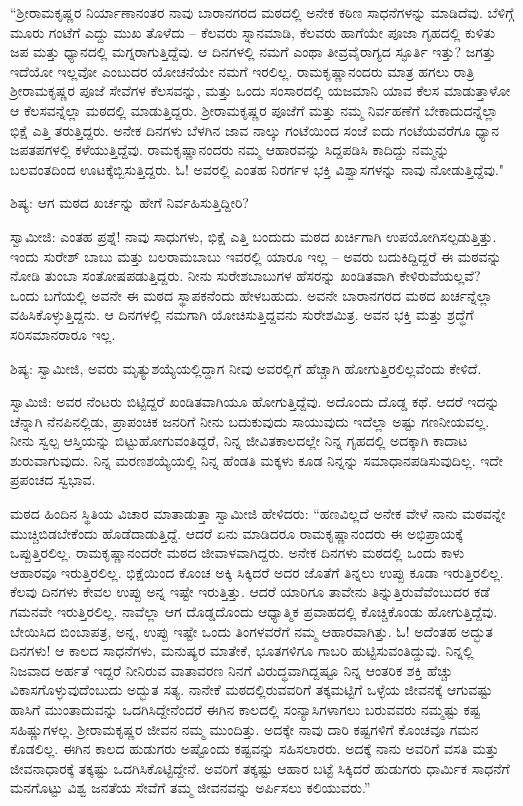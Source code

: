 “ಶ‍್ರೀರಾಮಕೃಷ್ಣರ ನಿರ್ಯಾಣಾನಂತರ ನಾವು ಬಾರಾನಗರದ ಮಠದಲ್ಲಿ ಅನೇಕ ಕಠಿಣ ಸಾಧನೆಗಳನ್ನು ಮಾಡಿದೆವು. ಬೆಳಿಗ್ಗೆ ಮೂರು ಗಂಟೆಗೆ ಎದ್ದು ಮುಖ ತೊಳೆದು – ಕೆಲವರು ಸ್ನಾನಮಾಡಿ, ಕೆಲವರು ಹಾಗೆಯೇ ಪೂಜಾ ಗೃಹದಲ್ಲಿ ಕುಳಿತು ಜಪ ಮತ್ತು ಧ್ಯಾನದಲ್ಲಿ ಮಗ್ನರಾಗುತ್ತಿದ್ದೆವು. ಆ ದಿನಗಳಲ್ಲಿ ನಮಗೆ ಎಂಥಾ ತೀವ್ರವೈರಾಗ್ಯದ ಸ್ಫೂರ್ತಿ ಇತ್ತು? ಜಗತ್ತು ಇದೆಯೋ ಇಲ್ಲವೋ ಎಂಬುದರ ಯೋಚನೆಯೇ ನಮಗೆ ಇರಲಿಲ್ಲ. ರಾಮಕೃಷ್ಣಾನಂದರು ಮಾತ್ರ ಹಗಲು ರಾತ್ರಿ ಶ‍್ರೀರಾಮಕೃಷ್ಣರ ಪೂಜೆ ಸೇವೆಗಳ ಕೆಲಸವನ್ನು, ಮತ್ತು ಒಂದು ಸಂಸಾರದಲ್ಲಿ ಯಜಮಾನಿ ಯಾವ ಕೆಲಸ ಮಾಡುತ್ತಾಳೋ ಆ ಕೆಲಸವನ್ನೆಲ್ಲಾ ಮಠದಲ್ಲಿ ಮಾಡುತ್ತಿದ್ದರು. ಶ‍್ರೀರಾಮಕೃಷ್ಣರ ಪೂಜೆಗೆ ಮತ್ತು ನಮ್ಮ ನಿರ್ವಹಣೆಗೆ ಬೇಕಾದುದನ್ನೆಲ್ಲಾ ಭಿಕ್ಷೆ ಎತ್ತಿ ತರುತ್ತಿದ್ದರು. ಅನೇಕ ದಿನಗಳು ಬೆಳಗಿನ ಜಾವ ನಾಲ್ಕು ಗಂಟೆಯಿಂದ ಸಂಜೆ ಐದು ಗಂಟೆಯವರೆಗೂ ಧ್ಯಾನ ಜಪತಪಗಳಲ್ಲಿ ಕಳೆಯುತ್ತಿದ್ದೆವು. ರಾಮಕೃಷ್ಣಾನಂದರು ನಮ್ಮ ಆಹಾರವನ್ನು ಸಿದ್ದಪಡಿಸಿ ಕಾದಿದ್ದು ನಮ್ಮನ್ನು ಬಲವಂತದಿಂದ ಊಟಕ್ಕೆಬ್ಬಿಸುತ್ತಿದ್ದರು. ಓ! ಅವರಲ್ಲಿ ಎಂತಹ ನಿರರ್ಗಳ ಭಕ್ತಿ ವಿಶ್ವಾಸಗಳನ್ನು ನಾವು ನೋಡುತ್ತಿದ್ದೆವು."

ಶಿಷ್ಯ: ಆಗ ಮಠದ ಖರ್ಚನ್ನು ಹೇಗೆ ನಿರ್ವಹಿಸುತ್ತಿದ್ದೀರಿ?

ಸ್ವಾಮೀಜಿ: ಎಂತಹ ಪ್ರಶ್ನೆ! ನಾವು ಸಾಧುಗಳು, ಭಿಕ್ಷೆ ಎತ್ತಿ ಬಂದುದು ಮಠದ ಖರ್ಚಿಗಾಗಿ ಉಪಯೋಗಿಸಲ್ಪಡುತ್ತಿತ್ತು. ಇಂದು ಸುರೇಶ್ ಬಾಬು ಮತ್ತು ಬಲರಾಮಬಾಬು ಇವರಲ್ಲಿ ಯಾರೂ ಇಲ್ಲ – ಅವರು ಬದುಕಿದ್ದಿದ್ದರೆ ಈ ಮಠವನ್ನು ನೋಡಿ ತುಂಬಾ ಸಂತೋಷಪಡುತ್ತಿದ್ದರು. ನೀನು ಸುರೇಶಬಾಬುಗಳ ಹೆಸರನ್ನು ಖಂಡಿತವಾಗಿ ಕೇಳಿರುವೆಯಲ್ಲವೆ? ಒಂದು ಬಗೆಯಲ್ಲಿ ಅವನೇ ಈ ಮಠದ ಸ್ಥಾಪಕನೆಂದು ಹೇಳಬಹುದು. ಅವನೇ ಬಾರಾನಗರದ ಮಠದ ಖರ್ಚನ್ನೆಲ್ಲಾ ವಹಿಸಿಕೊಳ್ಳುತ್ತಿದ್ದನು. ಆ ದಿನಗಳಲ್ಲಿ ನಮಗಾಗಿ ಯೋಚಿಸುತ್ತಿದ್ದವನು ಸುರೇಶಮಿತ್ರ. ಅವನ ಭಕ್ತಿ ಮತ್ತು ಶ್ರದ್ಧೆಗೆ ಸರಿಸಮಾನರಾರೂ ಇಲ್ಲ.

ಶಿಷ್ಯ: ಸ್ವಾಮೀಜಿ, ಅವರು ಮೃತ್ಯುಶಯ್ಯೆಯಲ್ಲಿದ್ದಾಗ ನೀವು ಅವರಲ್ಲಿಗೆ ಹೆಚ್ಚಾಗಿ ಹೋಗುತ್ತಿರಲಿಲ್ಲವೆಂದು ಕೇಳಿದೆ.

ಸ್ವಾಮಿಜಿ: ಅವರ ನೆಂಟರು ಬಿಟ್ಟಿದ್ದರೆ ಖಂಡಿತವಾಗಿಯೂ ಹೋಗುತ್ತಿದ್ದೆವು. ಅದೊಂದು ದೊಡ್ಡ ಕಥೆ. ಆದರೆ ಇದನ್ನು ಚೆನ್ನಾಗಿ ನೆನಪಿನಲ್ಲಿಡು, ಪ್ರಾಪಂಚಿಕ ಜನರಿಗೆ ನೀನು ಬದುಕುವುದು ಸಾಯುವುದು ಇದೆಲ್ಲಾ ಅಷ್ಟು ಗಣನೀಯವಲ್ಲ. ನೀನು ಸ್ವಲ್ಪ ಆಸ್ತಿಯನ್ನು ಬಿಟ್ಟುಹೋಗುವಂತಿದ್ದರೆ, ನಿನ್ನ ಜೀವಿತಕಾಲದಲ್ಲೇ ನಿನ್ನ ಗೃಹದಲ್ಲಿ ಅದಕ್ಕಾಗಿ ಕಾದಾಟ ಶುರುವಾಗುವುದು. ನಿನ್ನ ಮರಣಶಯ್ಯೆಯಲ್ಲಿ ನಿನ್ನ ಹೆಂಡತಿ ಮಕ್ಕಳು ಕೂಡ ನಿನ್ನನ್ನು ಸಮಾಧಾನಪಡಿಸುವುದಿಲ್ಲ. ಇದೇ ಪ್ರಪಂಚದ ಸ್ವಭಾವ.

ಮಠದ ಹಿಂದಿನ ಸ್ಥಿತಿಯ ವಿಚಾರ ಮಾತಾಡುತ್ತಾ ಸ್ವಾಮೀಜಿ ಹೇಳಿದರು: “ಹಣವಿಲ್ಲದೆ ಅನೇಕ ವೇಳೆ ನಾನು ಮಠವನ್ನೇ ಮುಚ್ಚಿಬಿಡಬೇಕೆಂದು ಹೊಡೆದಾಡುತ್ತಿದ್ದೆ. ಆದರೆ ಏನು ಮಾಡಿದರೂ ರಾಮಕೃಷ್ಣಾನಂದರು ಈ ಅಭಿಪ್ರಾಯಕ್ಕೆ ಒಪ್ಪುತ್ತಿರಲಿಲ್ಲ. ರಾಮಕೃಷ್ಣಾನಂದರೇ ಮಠದ ಜೀವಾಳವಾಗಿದ್ದರು. ಅನೇಕ ದಿನಗಳು ಮಠದಲ್ಲಿ ಒಂದು ಕಾಳು ಆಹಾರವೂ ಇರುತ್ತಿರಲಿಲ್ಲ. ಭಿಕ್ಷೆಯಿಂದ ಕೊಂಚ ಅಕ್ಕಿ ಸಿಕ್ಕಿದರೆ ಅದರ ಜೊತೆಗೆ ತಿನ್ನಲು ಉಪ್ಪು ಕೂಡಾ ಇರುತ್ತಿರಲಿಲ್ಲ. ಕೆಲವು ದಿನಗಳು ಕೇವಲ ಉಪ್ಪು ಅನ್ನ ಇಷ್ಟೇ ಇರುತ್ತಿತ್ತು. ಆದರೆ ಯಾರಿಗೂ ತಾವೇನು ತಿನ್ನುತ್ತಿರುವೆವೆಂಬುದರ ಕಡೆ ಗಮನವೇ ಇರುತ್ತಿರಲಿಲ್ಲ. ನಾವೆಲ್ಲಾ ಆಗ ದೊಡ್ಡದೊಂದು ಆಧ್ಯಾತ್ಮಿಕ ಪ್ರವಾಹದಲ್ಲಿ ಕೊಚ್ಚಿಕೊಂಡು ಹೋಗುತ್ತಿದ್ದೆವು. ಬೇಯಿಸಿದ ಬಿಂಬಾಪತ್ರ, ಅನ್ನ, ಉಪ್ಪು ಇಷ್ಟೇ ಒಂದು ತಿಂಗಳವರೆಗೆ ನಮ್ಮ ಆಹಾರವಾಗಿತ್ತು. ಓ! ಅದೆಂತಹ ಅದ್ಭುತ ದಿನಗಳು! ಆ ಕಾಲದ ಸಾಧನೆಗಳು, ಮನುಷ್ಯರ ಮಾತೇಕೆ, ಭೂತಗಳಿಗೂ ಗಾಬರಿ ಹುಟ್ಟಿಸುವಂತಿದ್ದುವು. ನಿನ್ನಲ್ಲಿ ನಿಜವಾದ ಅರ್ಹತೆ ಇದ್ದರೆ ನೀನಿರುವ ವಾತಾವರಣ ನಿನಗೆ ವಿರುದ್ಧವಾಗಿದ್ದಷ್ಟೂ ನಿನ್ನ ಆಂತರಿಕ ಶಕ್ತಿ ಹೆಚ್ಚು ವಿಕಾಸಗೊಳ್ಳುವುದೆಂಬುದು ಅದ್ಭುತ ಸತ್ಯ. ನಾನೇಕೆ ಮಠದಲ್ಲಿರುವವರಿಗೆ ತಕ್ಕಮಟ್ಟಿಗೆ ಒಳ್ಳೆಯ ಜೀವನಕ್ಕೆ ಆಗುವಷ್ಟು ಹಾಸಿಗೆ ಮುಂತಾದುವನ್ನು ಒದಗಿಸಿದ್ದೇನೆಂದರೆ ಈಗಿನ ಕಾಲದಲ್ಲಿ ಸಂನ್ಯಾಸಿಗಳಾಗಲು ಬರುವವರು ನಮ್ಮಷ್ಟು ಕಷ್ಟ ಸಹಿಷ್ಣುಗಳಲ್ಲ. ಶ‍್ರೀರಾಮಕೃಷ್ಣರ ಜೀವನ ನಮ್ಮ ಮುಂದಿತ್ತು. ಅದಕ್ಕೇ ನಾವು ದಾರಿ ಕಷ್ಟಗಳಿಗೆ ಕೊಂಚವೂ ಗಮನ ಕೊಡಲಿಲ್ಲ. ಈಗಿನ ಕಾಲದ ಹುಡುಗರು ಅಷ್ಟೊಂದು ಕಷ್ಟವನ್ನು ಸಹಿಸಲಾರರು. ಅದಕ್ಕೆ ನಾನು ಅವರಿಗೆ ವಸತಿ ಮತ್ತು ಜೀವನಾಧಾರಕ್ಕೆ ತಕ್ಕಷ್ಟು ಒದಗಿಸಿಕೊಟ್ಟಿದ್ದೇನೆ. ಅವರಿಗೆ ತಕ್ಕಷ್ಟು ಆಹಾರ ಬಟ್ಟೆ ಸಿಕ್ಕಿದರೆ ಹುಡುಗರು ಧಾರ್ಮಿಕ ಸಾಧನೆಗೆ ಮನಗೊಟ್ಟು ವಿಶ್ವ ಜನತೆಯ ಸೇವೆಗೆ ತಮ್ಮ ಜೀವನವನ್ನು ಅರ್ಪಿಸಲು ಕಲಿಯುವರು.”

